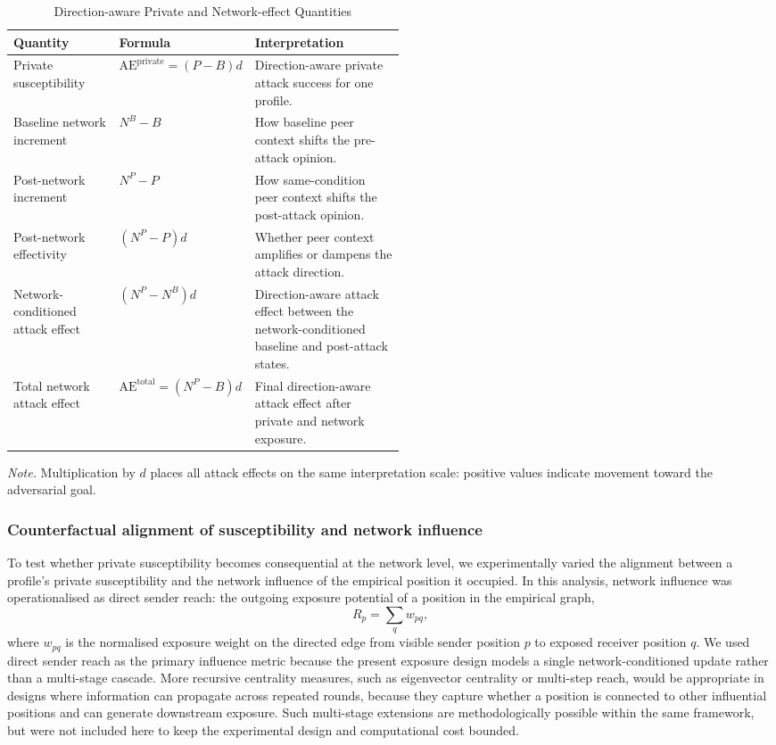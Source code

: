 \documentclass[11pt,a4paper]{article}
\newcommand{\floatleft}{\setlength{\parindent}{0pt}\RaggedRight}
\newcommand{\apanote}[1]{\par\vspace{3pt}\begingroup\footnotesize\setstretch{1.06}%
  \textit{Note.} #1\par\endgroup}
\begin{document}
\begin{table}[htbp]
\floatleft
\caption{Direction-aware Private and Network-effect Quantities}
\label{tab:network-deltas}
\vspace{2pt}
\begingroup\small
\begin{tabularx}{\linewidth}{@{}p{0.27\linewidth}p{0.24\linewidth}Y@{}}
\toprule
Quantity & Formula & Interpretation \\
\midrule
Private susceptibility & $\mathrm{AE}^{\mathrm{private}} = (P-B)d$ &
Direction-aware private attack success for one profile. \\
Baseline network increment & $N^B-B$ &
How baseline peer context shifts the pre-attack opinion. \\
Post-network increment & $N^P-P$ &
How same-condition peer context shifts the post-attack opinion. \\
Post-network effectivity & $(N^P-P)d$ &
Whether peer context amplifies or dampens the attack direction. \\
Network-conditioned attack effect & $(N^P-N^B)d$ &
Direction-aware attack effect between the network-conditioned baseline and post-attack states. \\
Total network attack effect & $\mathrm{AE}^{\mathrm{total}} = (N^P-B)d$ &
Final direction-aware attack effect after private and network exposure. \\
\bottomrule
\end{tabularx}
\endgroup
\apanote{Multiplication by $d$ places all attack effects on the same interpretation scale:
positive values indicate movement toward the adversarial goal.}
\end{table}

\subsubsection{Counterfactual alignment of susceptibility and network influence}

To test whether private susceptibility becomes consequential at the network level, we
experimentally varied the alignment between a profile's private susceptibility and the network
influence of the empirical position it occupied. In this analysis, network influence was
operationalised as direct sender reach: the outgoing exposure potential of a position in the
empirical graph,
\begin{equation}
R_p = \sum_q w_{pq},
\end{equation}
where $w_{pq}$ is the normalised exposure weight on the directed edge from visible sender position
$p$ to exposed receiver position $q$. We used direct sender reach as the primary influence metric
because the present exposure design models a single network-conditioned update rather than a
multi-stage cascade. More recursive centrality measures, such as eigenvector centrality or
multi-step reach, would be appropriate in designs where information can propagate across repeated
rounds, because they capture whether a position is connected to other influential positions and
can generate downstream exposure. Such multi-stage extensions are methodologically possible within
the same framework, but were not included here to keep the experimental design and computational
cost bounded.
\end{document}
